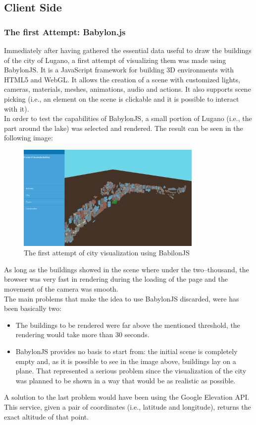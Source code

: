 \subsection{Client Side}
\subsubsection{The first Attempt: Babylon.js}
Immediately after having gathered the essential data useful to draw the buildings of the city of Lugano, a first attempt of visualizing them was made using BabylonJS. It is a JavaScript framework for building 3D environments with HTML5 and WebGL. It allows the creation of a scene with customized lights, cameras, materials, meshes, animations, audio and actions. It also supports scene picking (i.e., an element on the scene is clickable and it is possible to interact with it).\\

In order to test the capabilities of BabylonJS, a small portion of Lugano (i.e., the part around the lake) was selected and rendered. The result can be seen in the following image:
\begin{figure}[H]
\centering
\includegraphics[width=0.8\textwidth]{chapter3/images/babylonJS}
\caption{The first attempt of city visualization using BabilonJS}
\label{fig:babilonJS}
\end{figure}
As long as the buildings showed in the scene where under the two--thousand, the browser was very fast in rendering during the loading of the page and the movement of the camera was smooth.\\
The main problems that make the idea to use BabylonJS discarded, were has been basically two:
\begin{itemize}
	\item The buildings to be rendered were far above the mentioned threshold, the rendering would take more than 30 seconds.
	\item BabylonJS provides no basis to start from: the initial scene is completely empty and, as it is possible to see in the image above, buildings lay on a plane. That represented a serious problem since the visualization of the city was planned to be shown in a way that would be as realistic as possible.
\end{itemize}
A solution to the last problem would have been using the Google Elevation API. This service, given a pair of coordinates (i.e., latitude and longitude), returns the exact altitude of that point.\\

